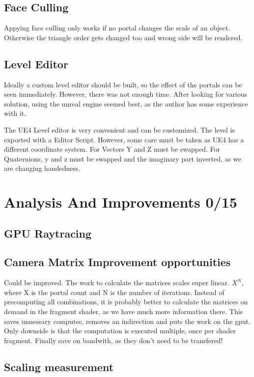 \subsection{Face Culling}
Appying face culling only works if no portal changes the scale of an object. Otherwise the triangle order gets changed too and wrong side will be rendered.

\subsection{Level Editor}
Ideally a custom level editor should be built, so the effect of the portals can be seen immediately. However, there was not enough time. After looking for various solution, using the unreal engine seemed best, as the author has some experience with it.

The UE4 Level editor is very convenient and can be customized. The level is exported with a Editor Script. However, some care must be taken as UE4 has a different coordinate system. For Vectors Y and Z must be swapped. For Quaternions, y and z must be swapped and the imaginary part inverted, as we are changing handedness.


\section{Analysis And Improvements 0/15}

\subsection{GPU Raytracing}

\subsection{Camera Matrix Improvement opportunities}
Could be improved. The work to calculate the matrices scales super linear. $X^{N}$, where X is the portal count and N is the number of iterations.
Instead of precomputing all combinations, it is probably better to calculate the matrices on demand in the fragment shader, as we have much more information there. This saves unnessary computes, removes an indirection and puts the work on the gput. Only downside is that the computation is executed multiple, once per shader fragment. Finally save on bandwith, as they don't need to be transfered!

\subsection{Scaling measurement}

